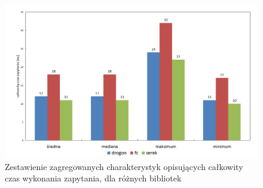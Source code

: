 \documentclass[12pt]{article}
\begin{document}
{{	{
		\begin{figure}[H]
			\centering
			\includegraphics[width=15cm,keepaspectratio=true]{./charts/pre_generated_charts/total_request_time_per_library_summary.png}
			\caption{Zestawienie zagregowanych charakterystyk opisujących całkowity czas wykonania zapytania, dla różnych bibliotek}
			\medskip
		\end{figure}
	}



}}
\end{document}

